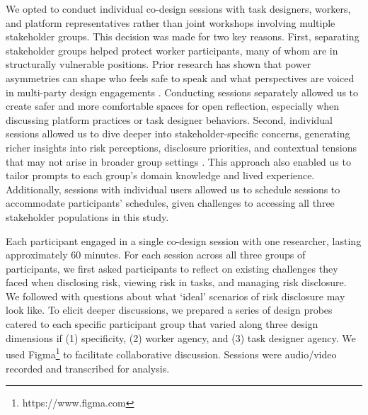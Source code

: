 We opted to conduct individual co-design sessions with task designers, workers, and platform representatives rather than joint workshops involving multiple stakeholder groups. This decision was made for two key reasons. First, separating stakeholder groups helped protect worker participants, many of whom are in structurally vulnerable positions. Prior research has shown that power asymmetries can shape who feels safe to speak and what perspectives are voiced in multi-party design engagements \cite{tang2024ai}. Conducting sessions separately allowed us to create safer and more comfortable spaces for open reflection, especially when discussing platform practices or task designer behaviors. Second, individual sessions allowed us to dive deeper into stakeholder-specific concerns, generating richer insights into risk perceptions, disclosure priorities, and contextual tensions that may not arise in broader group settings \cite{dillahunt2017designing}. This approach also enabled us to tailor prompts to each group’s domain knowledge and lived experience. Additionally, sessions with individual users allowed us to schedule sessions to accommodate participants' schedules, given challenges to accessing all three stakeholder populations in this study. 



Each participant engaged in a single co-design session with one researcher, lasting approximately 60 minutes. For each session across all three groups of participants, we first asked participants to reflect on existing challenges they faced when disclosing risk, viewing risk in tasks, and managing risk disclosure. We followed with questions about what `ideal' scenarios of risk disclosure may look like. To elicit deeper discussions, we prepared a series of design probes catered to each specific participant group that varied along three design dimensions if (1) specificity, (2) worker agency, and (3) task designer agency. We used Figma\footnote{https://www.figma.com} to facilitate collaborative discussion. Sessions were audio/video recorded and transcribed for analysis.

